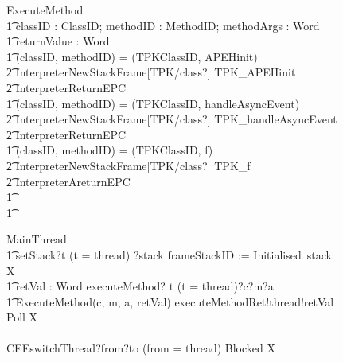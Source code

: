 \begin{figure}[tp!]
  \centering
  \setlength{\zedtab}{0.4cm}
  \setlength{\zedindent}{0pt}
  \setlength{\zedleftsep}{0pt}
  \setlength{\abovedisplayskip}{0pt}
  \setlength{\belowdisplayskip}{0pt}
  \setlength{\abovedisplayshortskip}{0pt}
  \setlength{\belowdisplayshortskip}{0pt}
  \begin{circusaction}
    ExecuteMethod \circdef \\
    \t1 \circval classID : ClassID; \circval methodID : MethodID; \circval methodArgs : \seq Word \circspot \\
    \t1 \circres returnValue : Word \circspot \\
    \t1 \circif (classID, methodID) = (TPKClassID, APEHinit) \circthen {} \\
    \t2 InterpreterNewStackFrame[TPK/class?] \circseq TPK\_APEHinit \circseq \\
    \t2 \lschexpract InterpreterReturnEPC \rschexpract  \\
    \t1 {} \circelse (classID, methodID) = (TPKClassID, handleAsyncEvent) \circthen {} \\
    \t2 InterpreterNewStackFrame[TPK/class?] \circseq TPK\_handleAsyncEvent \circseq \\
    \t2 \lschexpract InterpreterReturnEPC \rschexpract \\
    \t1 {} \circelse (classID, methodID) = (TPKClassID, f) \circthen {} \\
    \t2 InterpreterNewStackFrame[TPK/class?] \circseq TPK\_f \circseq \\
    \t2 \lschexpract InterpreterAreturnEPC \rschexpract \\
    \t1 {} \cdots {} \\
    \t1 \circfi
  \end{circusaction}

  \begin{circusaction}
    MainThread \circdef \\
    \t1 setStack?t \prefixcolon (t = thread) ?stack \then frameStackID := Initialised~stack \circseq \circmu X \circspot \\
    \t1 \circblockbegin
    \circvar retVal : Word \circspot
    executeMethod? t \prefixcolon (t = thread)?c?m?a \then {} \\
    \t1 ExecuteMethod(c, m, a, retVal) \circseq
    executeMethodRet!thread!retVal \then Poll \circseq  X \\
    {} \extchoice {} \\
    CEEswitchThread?from?to \prefixcolon (from = thread) \then Blocked \circseq X
    \circblockend
  \end{circusaction}
  

\end{figure}
